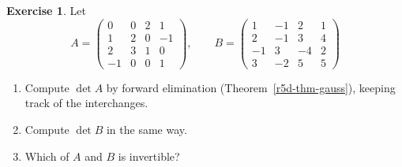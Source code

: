 \documentclass[12pt]{article}
\theoremstyle{definition}
\newtheorem{exercise}{Exercise}
\begin{document}
\begin{exercise}\label{r5d-dr-elimination}
Let
\[
A=\begin{pmatrix}0&0&2&1\\1&2&0&-1\\2&3&1&0\\-1&0&0&1\end{pmatrix},\qquad
B=\begin{pmatrix}1&-1&2&1\\2&-1&3&4\\-1&3&-4&2\\3&-2&5&5\end{pmatrix}
\]
\begin{enumerate}
\item Compute \(\det A\) by forward elimination (Theorem~\ref{r5d-thm-gauss}), keeping track of the interchanges.
\item Compute \(\det B\) in the same way.
\item Which of \(A\) and \(B\) is invertible?
\end{enumerate}
\end{exercise}
\end{document}
